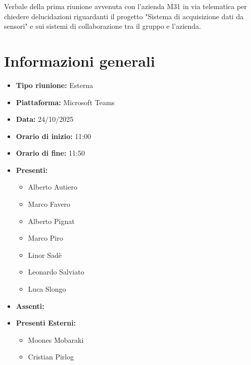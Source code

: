 \documentclass[a4paper,12pt]{article}
\begin{document}
\vspace{0.5cm}

\begin{center}
\begin{tcolorbox}[colback=secondaryblue!10,colframe=secondaryblue,width=0.9\textwidth,arc=3mm,boxrule=0.8pt,title={\bfseries Abstract}]
Verbale della prima riunione avvenuta con l'azienda M31 in via telematica per chiedere delucidazioni riguardanti il progetto "Sistema di acquisizione dati da sensori" e sui sistemi di collaborazione tra il gruppo e l'azienda.
\end{tcolorbox}
\end{center}


\newpage

\tableofcontents
\newpage


\section{Informazioni generali}

\begin{itemize}
    \item \textbf{Tipo riunione:} Esterna
    \item \textbf{Piattaforma:} Microsoft Teams
    \item \textbf{Data:} 24/10/2025
    \item \textbf{Orario di inizio:} 11:00
    \item \textbf{Orario di fine:} 11:50
    \item \textbf{Presenti:}
    \begin{itemize}[leftmargin=1.5em, itemsep=3pt, label={\rule[0.5ex]{0.4em}{0.4em}}]
        \item Alberto Autiero
        \item Marco Favero
        \item Alberto Pignat
        \item Marco Piro
        \item Linor Sadè
        \item Leonardo Salviato
        \item Luca Slongo
    \end{itemize}
    \item \textbf{Assenti:}
    \item \textbf{Presenti Esterni:}
    \begin{itemize}[leftmargin=1.5em, itemsep=3pt, label={\rule[0.5ex]{0.4em}{0.4em}}]
        \item Moones Mobaraki
        \item Cristian Pirlog
    \end{itemize}

\end{itemize}
\end{document}
